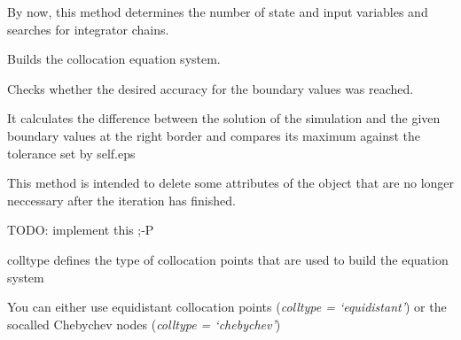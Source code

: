 \documentclass[letterpaper,10pt,english]{sphinxmanual}
\begin{document}
\begin{fulllineitems}
\begin{fulllineitems}
By now, this method determines the number of state and input variables and searches for
integrator chains.

\end{fulllineitems}


\begin{fulllineitems}
\label{pytrajectory:pytrajectory.trajectory.Trajectory.buildEQS}
Builds the collocation equation system.

\end{fulllineitems}


\begin{fulllineitems}
\label{pytrajectory:pytrajectory.trajectory.Trajectory.checkAccuracy}
Checks whether the desired accuracy for the boundary values was reached.

It calculates the difference between the solution of the simulation
and the given boundary values at the right border and compares its maximum against the
tolerance set by self.eps

\end{fulllineitems}


\begin{fulllineitems}
\label{pytrajectory:pytrajectory.trajectory.Trajectory.clear}
This method is intended to delete some attributes of the object that are no longer
neccessary after the iteration has finished.

TODO: implement this ;-P

\end{fulllineitems}


\begin{fulllineitems}
\label{pytrajectory:pytrajectory.trajectory.Trajectory.colltype}
colltype defines the type of collocation points
that are used to build the equation system

You can either use equidistant collocation points (\emph{colltype = `equidistant'})
or the socalled Chebychev nodes (\emph{colltype = `chebychev'})


\end{fulllineitems}
\end{fulllineitems}
\end{document}
